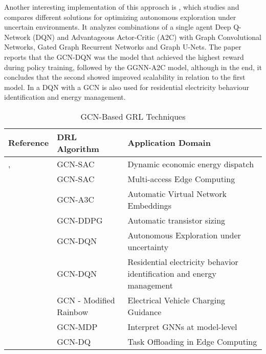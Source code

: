 Another interesting implementation of this approach is \cite{chenAutonomousExplorationUncertainty2020}, which studies and compares different solutions for optimizing autonomous exploration under uncertain environments. It analyzes combinations of a single agent Deep Q-Network (DQN) and Advantageous Actor-Critic (A2C) with Graph Convolutional Networks, Gated Graph Recurrent Networks and Graph U-Nets. The paper reports that the GCN-DQN was the model that achieved the highest reward during policy training, followed by the GGNN-A2C model, although in the end, it concludes that the second showed improved scalability in relation to the first model. In \cite{chenGraphRepresentationLearningbased2023} a DQN with a GCN is also used for residential electricity behaviour identification and energy management.

\begin{table}[h!]
	\centering
	\caption{GCN-Based GRL Techniques}
	\begin{tabular}{|P{2cm}|P{2cm}|p{5cm}|  }
		\hline
		\textbf{Reference} & \textbf{DRL Algorithm} & \textbf{Application Domain} \\
		\hline
		\cite{liNovelGraphReinforcement2022}, \cite{chenScalableGraphReinforcement2023} & GCN-SAC & Dynamic economic energy dispatch \\ \hline
		\cite{lengGraphConvolutionalNetworkbased2021} & GCN-SAC & Multi-access Edge Computing \\ \hline
		\cite{yanAutomaticVirtualNetwork2020} & GCN-A3C & Automatic Virtual Network Embeddings \\ \hline
		\cite{wangGCNRLCircuitDesigner2020} & GCN-DDPG & Automatic transistor sizing \\ \hline
		\cite{chenAutonomousExplorationUncertainty2020} & GCN-DQN  & Autonomous Exploration under uncertainty \\  \hline
		\cite{chenGraphRepresentationLearningbased2023} & GCN-DQN & Residential electricity behavior identification and energy management \\ \hline
		\cite{xingGraphReinforcementLearningBased2023} & GCN - Modified Rainbow & Electrical Vehicle Charging Guidance \\ \hline
		\cite{yuanXGNNModelLevelExplanations2020} & GCN-MDP & Interpret GNNs at model-level \\ \hline
		\cite{tangDependentTaskOffloading2020} & GCN-DQ & Task Offloading in Edge Computing \\ \hline
	\end{tabular}
\end{table}




